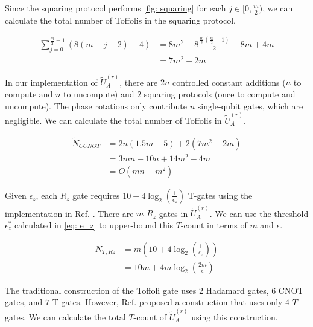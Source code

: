 Since the squaring protocol performs \ref{fig: squaring} for each $j \in [0, \frac{m}{2})$, we can calculate the total number of Toffolis in the squaring protocol.

\begin{equation}
    \begin{split}
        \sum_{j = 0}^{\frac{m}{2} - 1} (8(m - j - 2) + 4) &= 8m^2 - 8\frac{\frac{m}{2}(\frac{m}{2} - 1)}{2} - 8m + 4m \\
        &= 7m^2 - 2m
    \end{split}
\end{equation}

In our implementation of $\tilde{U}_A^{(r)}$, there are $2n$ controlled constant additions ($n$ to compute and $n$ to uncompute) and $2$ squaring protocols (once to compute and uncompute). The phase rotations only contribute $n$ single-qubit gates, which are negligible. We can calculate the total number of Toffolis in $\tilde{U}_A^{(r)}$.

\begin{equation}
    \begin{split}
        \tilde{N}_{CCNOT} &= 2n(1.5m - 5) + 2(7m^2 - 2m) \\
        &= 3mn - 10n + 14m^2 - 4m \\
        &= O(mn + m^2) \label{eq: toffolis}
    \end{split}
\end{equation}

Given $\epsilon_z$, each $R_z$ gate requires $10 + 4\log_2(\frac{1}{\epsilon_z})$ T-gates using the implementation in Ref. \cite{Rz}. There are $m$ $R_z$ gates in $\tilde{U}_A^{(r)}$. We can use the threshold $\epsilon_z^*$ calculated in \eqref{eq: e_z} to upper-bound this $T$-count in terms of $m$ and $\epsilon$.

\begin{equation}
    \begin{split}
        \tilde{N}_{T; Rz} &= m(10 + 4\log_2(\frac{1}{\epsilon_z})) \\
        &= 10m + 4m\log_2(\frac{2m}{\epsilon})
    \end{split}
\end{equation}

The traditional construction of the Toffoli gate uses $2$ Hadamard gates, $6$ CNOT gates, and $7$ T-gates. However, Ref. \cite{Toffoli} proposed a construction that uses only $4$ $T$-gates. We can calculate the total $T$-count of $\tilde{U}_A^{(r)}$ using this construction.

